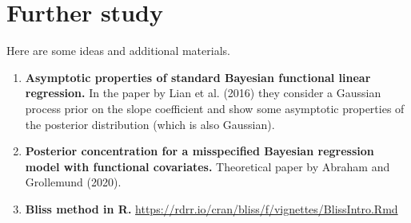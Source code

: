 \documentclass[
  a4paper,
	fontsize=11pt, %
	twoside=false, %
  secnumdepth=2,
	numbers=noenddot, %
]{kaohandt}
\begin{document}



\renewcommand*{\bibfont}{\small}
\printbibliography[title=Bibliography]%



\appendix

\section{Further study}

Here are some ideas and additional materials.

\begin{enumerate}

  \item \textbf{Asymptotic properties of standard Bayesian functional linear regression.} In the paper by Lian et al. (2016) they consider a Gaussian process prior on the slope coefficient and show some asymptotic properties of the posterior distribution (which is also Gaussian).

  \item \textbf{Posterior concentration for a misspecified Bayesian regression model with functional covariates.} Theoretical paper by Abraham and Grollemund (2020).

  \item \textbf{Bliss method in R.} \url{https://rdrr.io/cran/bliss/f/vignettes/BlissIntro.Rmd}

\end{enumerate}
\end{document}
